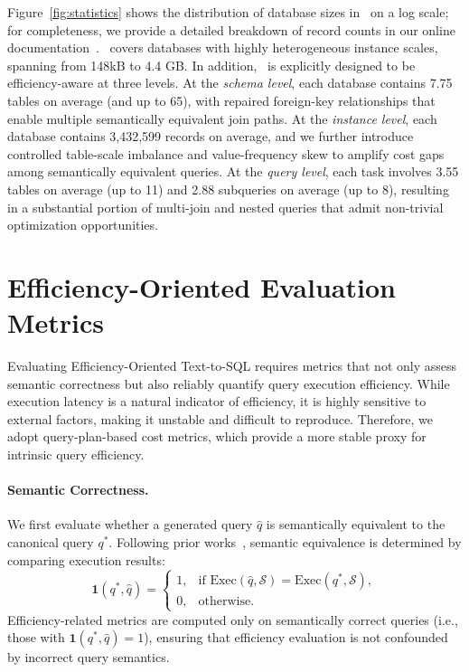 Figure~\ref{fig:statistics} shows the distribution of database sizes in \benchmark\ on a log scale; for completeness, we provide a detailed breakdown of record counts in our online documentation~\cite{eesqlbench_database_size}.
\benchmark\ covers databases with highly heterogeneous instance scales, spanning from 148kB to 4.4 GB.
In addition, \benchmark\ is explicitly designed to be efficiency-aware at three levels.
At the \emph{schema level}, each database contains 7.75 tables on average (and up to 65), with repaired foreign-key relationships that enable multiple semantically equivalent join paths.
At the \emph{instance level}, each database contains 3,432,599 records on average, and we further introduce controlled table-scale imbalance and value-frequency skew to amplify cost gaps among semantically equivalent queries.
At the \emph{query level}, each task involves 3.55 tables on average (up to 11) and 2.88 subqueries on average (up to 8), resulting in a substantial portion of multi-join and nested queries that admit non-trivial optimization opportunities.



\section{Efficiency-Oriented Evaluation Metrics}
\label{sec:metrics}

Evaluating Efficiency-Oriented Text-to-SQL requires metrics that not only assess semantic correctness but also reliably quantify query execution efficiency. 
While execution latency is a natural indicator of efficiency, it is highly sensitive to external factors, making it unstable and difficult to reproduce. 
Therefore, we adopt query-plan-based cost metrics, which provide a more stable proxy for intrinsic query efficiency.

\paragraph{Semantic Correctness.}
We first evaluate whether a generated query $\hat{q}$ is semantically equivalent to the canonical query $q^*$.
Following prior works~\cite{yu2018spider,li2023can}, semantic equivalence is determined by comparing execution results:
\[
\mathbf{1}(q^*, \hat{q}) =
\begin{cases}
	1, & \text{if } \text{Exec}(\hat{q}, \mathcal{S}) = \text{Exec}(q^*, \mathcal{S}), \\
	0, & \text{otherwise}.
\end{cases}
\]
Efficiency-related metrics are computed only on semantically correct queries (i.e., those with $\mathbf{1}(q^*, \hat{q}) = 1$), ensuring that efficiency evaluation is not confounded by incorrect query semantics.


